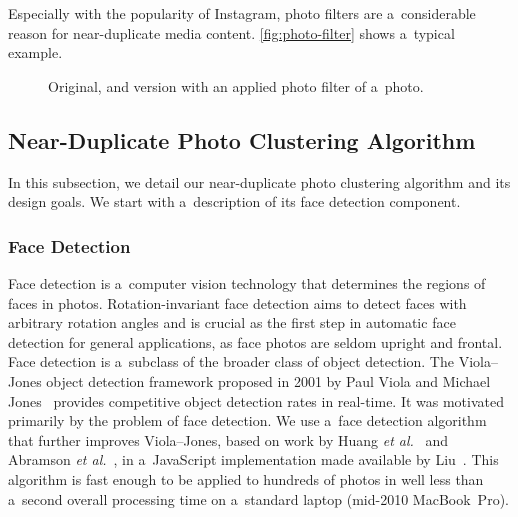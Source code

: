 Especially with the popularity of Instagram, photo filters
are a~considerable reason for near-duplicate media content.
\autoref{fig:photo-filter} shows a~typical example.

\begin{figure}[h!]
  \centering
  \caption{Original, and version with an applied photo filter of a~photo.}
  \label{fig:photo-filter}  
\end{figure}

\subsection{Near-Duplicate Photo Clustering Algorithm}
\label{sec:near-duplicate-clustering-algorithm}

In this subsection, we detail our near-duplicate photo clustering algorithm
and its design goals.
We start with a~description of its face detection component.

\subsubsection{Face Detection}
\label{sec:face-detection}

Face detection is a~computer vision technology
that determines the regions of faces in photos.
Rotation-invariant face detection aims to detect faces with arbitrary
rotation angles and is crucial as the first step in automatic face detection
for general applications, as face photos are seldom upright and frontal.
Face detection is a~subclass of the broader class of object detection.
The Viola--Jones object detection framework proposed in 2001
by Paul Viola and Michael
Jones~\cite{viola2001objectdetection,viola2004robust}
provides competitive object detection rates in real-time.
It was motivated primarily by the problem of face detection.
We use a~face detection algorithm that further improves Viola--Jones,
based on work by Huang \emph{et al.}~\cite{huang2007facedetection}
and Abramson \emph{et al.}~\cite{abramson2007yef},
in a~JavaScript implementation made available by Liu~\cite{liu2012facedetection}.
This algorithm is fast enough to be applied to hundreds of photos
in well less than a~second overall processing time on a~standard laptop
(mid-2010 MacBook~Pro).


